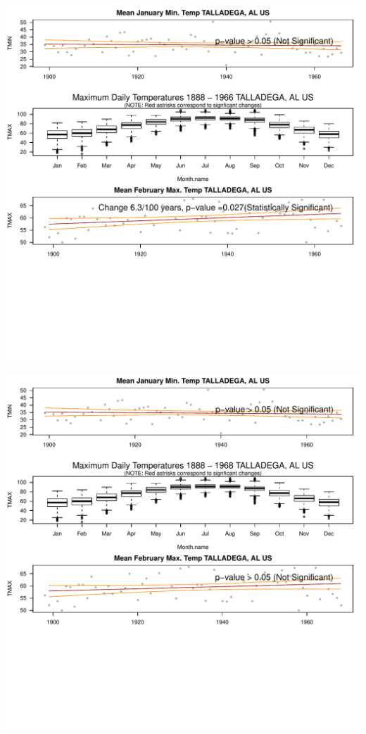 \documentclass{article}\usepackage[]{graphicx}\usepackage[]{color}
\makeatletter
\def\maxwidth{ %
  \ifdim\Gin@nat@width>\linewidth
    \linewidth
  \else
    \Gin@nat@width
  \fi
}
\newenvironment{knitrout}{}{} %
\makeatother
\begin{document}
\begin{knitrout}
\includegraphics[width=\maxwidth]{figure/static_template-29} 

\includegraphics[width=\maxwidth]{figure/static_template-30} 


\end{knitrout}
\end{document}
